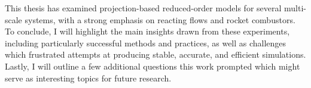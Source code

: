 This thesis has examined projection-based reduced-order models for several multi-scale systems, with a strong emphasis on reacting flows and rocket combustors. To conclude, I will highlight the main insights drawn from these experiments, including particularly successful methods and practices, as well as challenges which frustrated attempts at producing stable, accurate, and efficient simulations. Lastly, I will outline a few additional questions this work prompted which might serve as interesting topics for future research.